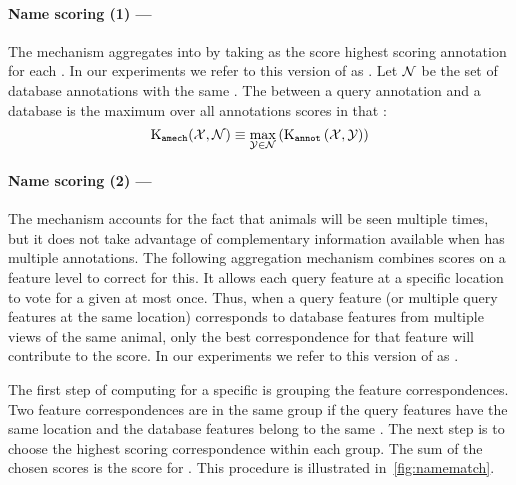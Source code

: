         \paragraph{Name scoring (1) --- \csumprefix{}} %

            The \cscoring{} mechanism aggregates \annotscores{} into \namescores{} by taking as the score highest
            scoring annotation for each \name{}. In our experiments we refer to this version of \namescoring{} as
            \csum{}. Let $\mathcal{N}$ be the set of database annotations with the same \name{}. The \cscore{} between a
            query annotation and a database \name{} is the maximum over all annotations scores in that \name{}:
            \begin{equation}
                \operatorname{K_{{\tt{amech}}}}(\mathcal{X}, \mathcal{N}) 
                \equiv
                \max_{\mathcal{Y} \in \mathcal{N}}
                \left(
                    \operatorname{K_{\tt annot}}\left(\mathcal{X}, \mathcal{Y}\right)
                \right)
            \end{equation}

        \paragraph{Name scoring (2) --- \nsumprefix{}} %
            The \cscoring{} mechanism accounts for the fact that animals will be seen multiple times, but it does
            not take advantage of complementary information available when \aan{\name{}} has multiple annotations.
            The following aggregation mechanism combines scores on a feature level to correct for this. It allows
            each query feature at a specific location to vote for a given \name{} at most once. Thus, when a query
            feature (or multiple query features at the same location) corresponds to database features from
            multiple views of the same animal, only the best correspondence for that feature will contribute to the
            score. In our experiments we refer to this version of \namescoring{} as \nsum{}.

            The first step of computing \aan{\namescore{}} for a specific \name{} is grouping the feature
              correspondences.
            Two feature correspondences are in the same group if the query features have the same location and
              the database features belong to the same \name{}.
            The next step is to choose the highest scoring correspondence within each group.
            The sum of the chosen scores is the score for \aan{\name{}}.
            This procedure is illustrated in~\cref{fig:namematch}.

